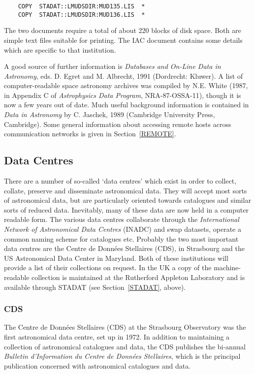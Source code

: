 \documentclass[twoside,11pt]{article}
\newcommand{\xlabel}[1]{}
\begin{document}
\begin{verbatim}
    COPY  STADAT::LMUDSDIR:MUD135.LIS  *
    COPY  STADAT::LMUDSDIR:MUD136.LIS  *
\end{verbatim}

The two documents require a total of about 220 blocks of disk space.
Both are simple text files suitable for printing. The IAC document
contains some details which are specific to that institution.

A good source of further information is {\it Databases and On-Line Data
in Astronomy}, eds. D. Egret and M. Albrecht, 1991 (Dordrecht: Kluwer).
A list of computer-readable space astronomy archives was compiled by
N.E. White (1987, in Appendix C of {\it Astrophysics Data Program},
NRA-87-OSSA-11), though it is now a few years out of date. Much useful
background information is contained in {\it Data in Astronomy} by C.
Jaschek, 1989 (Cambridge University Press, Cambridge). Some general
information about accessing remote hosts across communication networks
is given in Section~\ref{REMOTE}.

\subsection{Data Centres
\xlabel{data_centres}\label{INADC}}

There are a number of so-called `data centres' which exist in order to
collect, collate, preserve and disseminate astronomical data. They will
accept most sorts of astronomical data, but are particularly oriented
towards catalogues and similar sorts of reduced data. Inevitably, many
of these data are now held in a computer readable form. The various data
centres collaborate through the {\it International Network of
Astronomical Data Centres} (INADC) and swap datasets, operate a common
naming scheme for catalogues etc. Probably the two most important data
centres are the Centre de Donn\'{e}es Stellaires (CDS), in Strasbourg
and the US Astronomical Data Center in Maryland. Both of these
institutions will provide a list of their collections on request. In the
UK a copy of the machine-readable collection is maintained at the
Rutherford Appleton Laboratory and is available through STADAT (see
Section~\ref{STADAT}, above).

\subsubsection{CDS
\xlabel{cds}\label{CDS}}

The Centre de Donn\'{e}es Stellaires (CDS) at the Strasbourg Observatory
was the first astronomical data centre, set up in 1972. In addition to
maintaining a collection of astronomical catalogues and data, the CDS
publishes the bi-annual {\it Bulletin d'Information du Centre de
Donn\'{e}es Stellaires}, which is the principal publication concerned
with astronomical catalogues and data.
\end{document}
